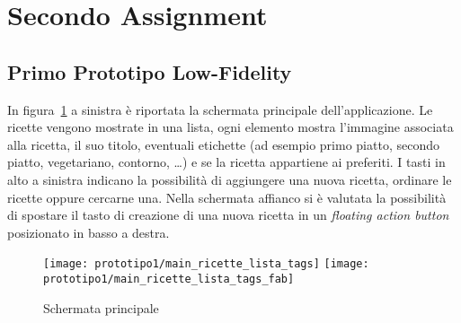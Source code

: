 







\section{Secondo Assignment}

\subsection{Primo Prototipo Low-Fidelity}

%

In figura~\ref{fig:p1_main} a sinistra è riportata la schermata principale dell'applicazione.
Le ricette vengono mostrate in una lista, ogni elemento mostra l'immagine associata alla ricetta, il suo titolo, eventuali etichette (ad esempio primo piatto, secondo piatto, vegetariano, contorno, \dots ) e se la ricetta appartiene ai preferiti.
I tasti in alto a sinistra indicano la possibilità di aggiungere una nuova ricetta, ordinare le ricette oppure cercarne una.
Nella schermata affianco si è valutata la possibilità di spostare il tasto di creazione di una nuova ricetta in un \textit{floating action button} posizionato in basso a destra.

\begin{figure}[ht]
  \begin{center}
    \texttt{[image: prototipo1/main\_ricette\_lista\_tags]}
    \texttt{[image: prototipo1/main\_ricette\_lista\_tags\_fab]}
    \caption{Schermata principale}
    \label{fig:p1_main}
  \end{center}
\end{figure}

